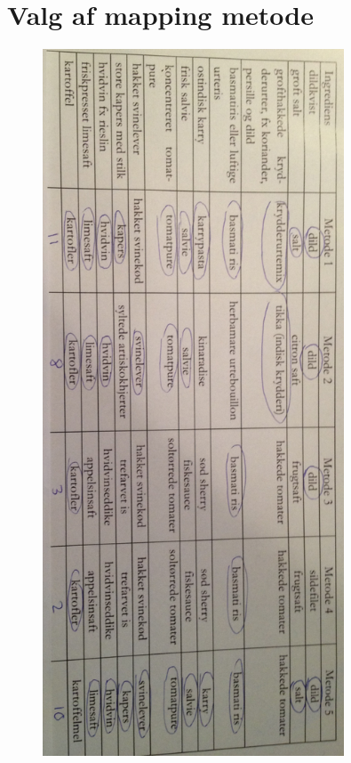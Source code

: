 \chapter{Valg af mapping metode}
\label{ap:valgafmappingmetode}

\begin{figure}
\centering
\includegraphics[width=0.8\textwidth]{billeder/valgafmappingmetode.png}
\end{figure}
